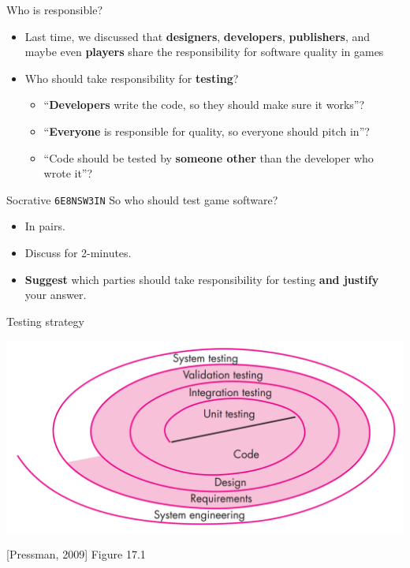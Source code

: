 \begin{frame}{Who is responsible?}
    \begin{itemize}
        \item Last time, we discussed that \textbf{designers}, \textbf{developers},
            \textbf{publishers}, and maybe even \textbf{players}
            share the responsibility for software quality in games \pause
        \item Who should take responsibility for \textbf{testing}? \pause
            \begin{itemize}
                \item ``\textbf{Developers} write the code, so they should make sure it works''? \pause
                \item ``\textbf{Everyone} is responsible for quality, so everyone should pitch in''? \pause
                \item ``Code should be tested by \textbf{someone other} than the developer who wrote it''?
            \end{itemize}
    \end{itemize}
\end{frame}

\begin{frame}{Socrative \texttt{6E8NSW3IN}}
    So who should test game software?
	\begin{itemize}
		\item In pairs.
		\item Discuss for 2-minutes.
		\item \textbf{Suggest} which parties should take responsibility for testing \textbf{and justify} your answer. 
	\end{itemize}
\end{frame}

\begin{frame}{Testing strategy}
    \begin{center}
        \includegraphics[width=\textwidth]{pressman_17_1}
        
        {\tiny [Pressman, 2009] Figure 17.1}
    \end{center}
\end{frame}

